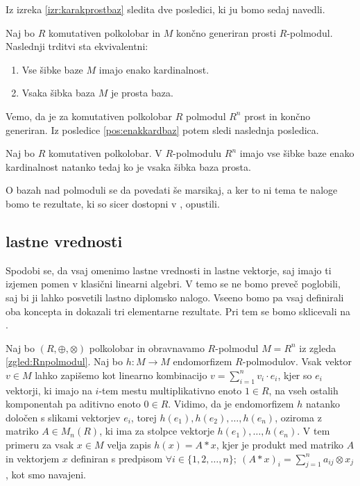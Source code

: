 \documentclass[mat1]{fmfdelo}
\newcommand{\map}[3]{\ensuremath{{#1}:{#2}\rightarrow{#3}}}
\begin{document}
Iz izreka \ref{izr:karakprostbaz} sledita dve posledici, ki ju bomo sedaj navedli.

\begin{posledica}\label{pos:enakkardbaz}
	Naj bo $R$ komutativen polkolobar in $M$ končno generiran prosti $R$-polmodul. Naslednji trditvi sta ekvivalentni: \begin{enumerate}
		\item Vse šibke baze $M$ imajo enako kardinalnost.
		\item Vsaka šibka baza $M$ je prosta baza.
	\end{enumerate}
\end{posledica}
Vemo, da je za komutativen polkolobar $R$ polmodul $R^n$ prost in končno generiran. Iz posledice \ref{pos:enakkardbaz} potem sledi naslednja posledica.
\begin{posledica}
	Naj bo $R$ komutativen polkolobar. V $R$-polmodulu $R^n$ imajo vse šibke baze enako kardinalnost natanko tedaj ko je vsaka šibka baza prosta.
\end{posledica}

O bazah nad polmoduli se da povedati še marsikaj, a ker to ni tema te naloge bomo te rezultate, ki so sicer dostopni v \cite{bib:Tanbase}, opustili.

\subsection{lastne vrednosti}\label{subsect:eigen}
Spodobi se, da vsaj omenimo lastne vrednosti in lastne vektorje, saj imajo ti izjemen pomen v klasični linearni algebri. V temo se ne bomo preveč poglobili, saj bi ji lahko posvetili lastno diplomsko nalogo. Vseeno bomo pa vsaj definirali oba koncepta in dokazali tri elementarne rezultate. Pri tem se bomo sklicevali na \cite[poglavje 6]{bib:Gondran}.

Naj bo $(R, \oplus, \otimes)$ polkolobar in obravnavamo $R$-polmodul $M = R^n$ iz zgleda \ref{zgled:Rnpolmodul}. Naj bo $\map{h}{M}{M}$ endomorfizem $R$-polmodulov. Vsak vektor $v\in M$ lahko zapišemo kot linearno kombinacijo $v = \sum_{i = 1}^{n}v_i\cdot e_i$, kjer so $e_i$ vektorji, ki imajo na $i$-tem mestu multiplikativno enoto $1\in R$, na vseh ostalih komponentah pa aditivno enoto $0\in R$. Vidimo, da je endomorfizem $h$ natanko določen s slikami vektorjev $e_i$, torej $h(e_1), h(e_2), \ldots, h(e_n)$, oziroma z matriko $A\in M_n(R)$, ki ima za stolpce vektorje $h(e_1), \ldots, h(e_n)$. V tem primeru za vsak $x\in M$ velja zapis $h(x) = A*x$, kjer je produkt med matriko $A$ in vektorjem $x$ definiran s predpisom $\forall i\in \{1, 2, \ldots, n\};~(A*x)_i = \sum_{j = 1}^{n} a_{ij}\otimes x_j$, kot smo navajeni.
\end{document}
